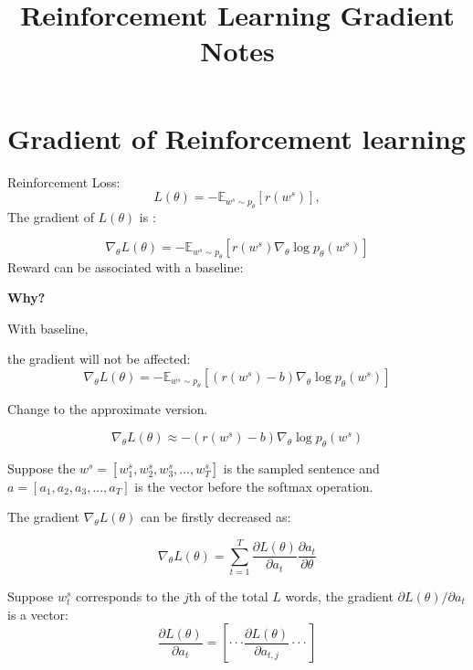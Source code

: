 \documentclass[10pt,twocolumn]{article}
\begin{document}
\title{Reinforcement Learning Gradient Notes}


\maketitle



\section{Gradient of Reinforcement learning}

Reinforcement Loss:
\begin{equation}
L(\theta) = -\mathbb{E}_{w^{s} \sim p_{\theta}}[r(w^{s})],
\end{equation}
The gradient of $L(\theta)$ is :


\begin{equation}
\nabla_{\theta} L(\theta)  =  - \mathbb{E}_{w^{s} \sim p_{\theta}} [r(w^{s}) \nabla_{\theta} \log p_{\theta}(w^{s}) ]
\end{equation}
Reward can be associated with a baseline:

\textbf{Why?}


With baseline,

the gradient will not be affected:
\begin{equation}
\nabla_{\theta} L(\theta)  =  - \mathbb{E}_{w^{s} \sim p_{\theta}} [(r(w^{s})-b) \nabla_{\theta} \log p_{\theta}(w^{s}) ]
\end{equation}

Change to the approximate version.

\begin{equation}
\nabla_{\theta} L(\theta)  \approx  - (r(w^{s})-b) \nabla_{\theta} \log p_{\theta}(w^{s})
\end{equation}


Suppose the $w^{s} = [w^{s}_{1} ,w^{s}_{2} ,w^{s}_{3} , ..., w^{s}_{T} ]$ is the sampled sentence and $a = [a_{1} ,a_{2} ,a_{3} , ..., a_{T} ]$ is the vector before the softmax operation.

The gradient $\nabla_{\theta} L(\theta)$ can be firstly decreased as:

\begin{equation}
\nabla_{\theta} L(\theta)  = \sum_{t=1}^{T} \frac{\partial L(\theta)}{\partial a_{t}} \frac{\partial a_{t}}{\partial \theta}
\end{equation}


Suppose $ w_{t}^{s}$ corresponds to the $j$th of the total $L$ words, the gradient ${\partial L(\theta)}/{\partial a_{t}} $ is a vector:
\begin{equation}
  \frac{\partial L(\theta)}{\partial a_{t}} = [ \cdot \cdot \cdot \frac{\partial L(\theta) }{ \partial a_{t,j} } \cdot \cdot \cdot]
\end{equation}
\end{document}
